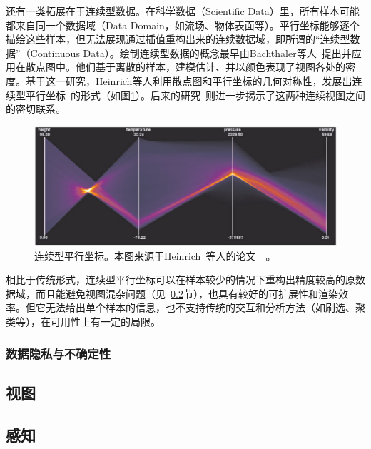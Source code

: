 \documentclass[12pt,twocolumn]{article}
\begin{document}
还有一类拓展在于连续型数据。在科学数据（Scientific Data）里，所有样本可能都来自同一个数据域（Data Domain，如流场、物体表面等）。平行坐标能够逐个描绘这些样本，但无法展现通过插值重构出来的连续数据域，即所谓的“连续型数据”（Continuous Data）。绘制连续型数据的概念最早由Bachthaler等人~\citep{bachthaler2008continuous}提出并应用在散点图中。他们基于离散的样本，建模估计、并以颜色表现了视图各处的密度。基于这一研究，Heinrich等人利用散点图和平行坐标的几何对称性，发展出连续型平行坐标~\citep{heinrich2009continuous}的形式（如图\ref{fig:PC_Data_Continuous2}）。后来的研究~\citep{lehmann2011features}则进一步揭示了这两种连续视图之间的密切联系。

\begin{figure}[!htb]
\centering
\includegraphics[width=1.0\linewidth]{images/PC_Data_Continuous2.eps}
\caption{\label{fig:PC_Data_Continuous2}连续型平行坐标。本图来源于Heinrich~等人的论文~\citep{heinrich2009continuous}~。
}
\end{figure}

相比于传统形式，连续型平行坐标可以在样本较少的情况下重构出精度较高的原数据域，而且能避免视图混杂问题（见~\ref{subsection:dataImpro}节），也具有较好的可扩展性和渲染效率。但它无法给出单个样本的信息，也不支持传统的交互和分析方法（如刷选、聚类等），在可用性上有一定的局限。

\subsubsection{数据隐私与不确定性}



\subsection{视图}
\label{subsection:dataImpro}

\subsection{感知}
\label{subsection:dataImpro}
\end{document}
